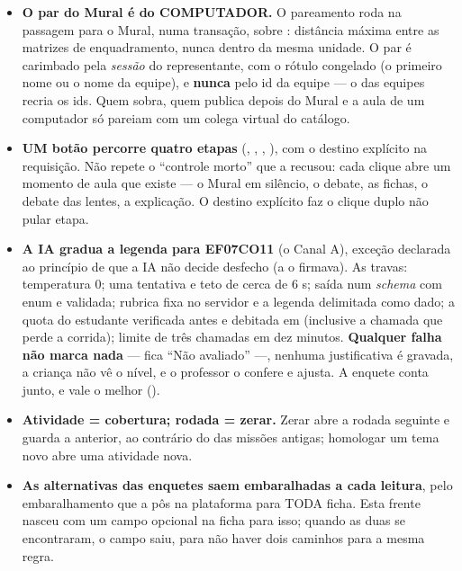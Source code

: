 \begin{itemize}
  \item \textbf{O par do Mural é do COMPUTADOR.} O pareamento roda na passagem para
    o Mural, numa transação, sobre : distância máxima
    entre as matrizes de enquadramento, nunca dentro da mesma unidade. O par é
    carimbado pela \emph{sessão} do representante, com o rótulo congelado (o
    primeiro nome ou o nome da equipe), e \textbf{nunca} pelo id da equipe --- o
     das equipes recria os ids. Quem sobra, quem publica depois do Mural e a
    aula de um computador só pareiam com um colega virtual do catálogo.
  \item \textbf{UM botão percorre quatro etapas} (, ,
    , ), com o destino explícito na requisição. Não
    repete o \enquote{controle morto} que a  recusou: cada clique abre
    um momento de aula que existe --- o Mural em silêncio, o debate, as fichas, o
    debate das lentes, a explicação. O destino explícito faz o clique duplo não
    pular etapa.
  \item \textbf{A IA gradua a legenda para EF07CO11} (o Canal A), exceção declarada
    ao princípio de que a IA não decide desfecho (a  o firmava). As
    travas: temperatura 0; uma tentativa e teto de cerca de 6 s; saída num
    \emph{schema} com enum e validada; rubrica fixa no servidor e a legenda
    delimitada como dado; a quota do estudante verificada antes e debitada em
     (inclusive a chamada que perde a corrida); limite de três
    chamadas em dez minutos. \textbf{Qualquer falha não marca nada} --- fica
    \enquote{Não avaliado} ---, nenhuma justificativa é gravada, a criança não vê o
    nível, e o professor o confere e ajusta. A enquete  conta junto, e vale
    o melhor ().
  \item \textbf{Atividade = cobertura; rodada = zerar.} Zerar abre a rodada
    seguinte e guarda a anterior, ao contrário do  das missões antigas;
    homologar um tema novo abre uma atividade nova.
  \item \textbf{As alternativas das enquetes saem embaralhadas a cada leitura},
    pelo embaralhamento que a  pôs na plataforma para TODA ficha.
    Esta frente nasceu com um campo opcional na ficha para isso; quando as duas
    se encontraram, o campo saiu, para não haver dois caminhos para a mesma
    regra.
\end{itemize}

